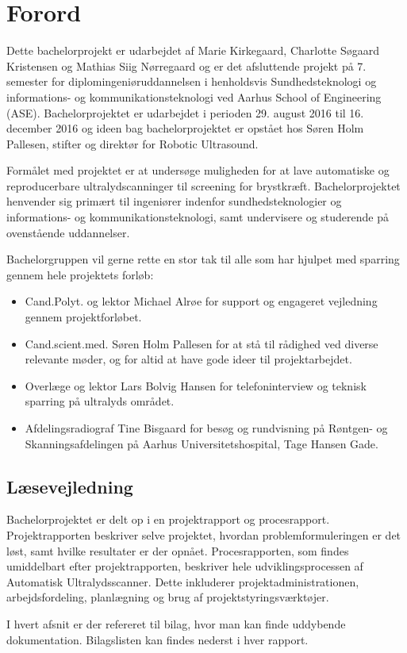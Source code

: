 \chapter{Forord}
Dette bachelorprojekt er udarbejdet af Marie Kirkegaard, Charlotte Søgaard Kristensen og Mathias Siig Nørregaard og er det afsluttende projekt på 7. semester for diplomingeniøruddannelsen i henholdsvis Sundhedsteknologi og informations- og kommunikationsteknologi ved Aarhus School of Engineering (ASE). Bachelorprojektet er udarbejdet i perioden 29. august 2016 til 16. december 2016 og ideen bag bachelorprojektet er opstået hos Søren Holm Pallesen, stifter og direktør for Robotic Ultrasound. 

Formålet med projektet er at undersøge muligheden for at lave automatiske og reproducerbare ultralydscanninger til screening for brystkræft. Bachelorprojektet henvender sig primært til ingeniører indenfor sundhedsteknologier og informations- og  kommunikationsteknologi, samt undervisere og studerende på ovenstående uddannelser. 

Bachelorgruppen vil gerne rette en stor tak til alle som har hjulpet med sparring gennem hele projektets forløb:

\begin{itemize}
\item Cand.Polyt. og lektor Michael Alrøe for support og engageret vejledning gennem projektforløbet.

\item Cand.scient.med. Søren Holm Pallesen for at stå til rådighed ved diverse relevante
møder, og for altid at have gode ideer til projektarbejdet.

\item Overlæge og lektor Lars Bolvig Hansen for telefoninterview og teknisk sparring på ultralyds området.

\item Afdelingsradiograf Tine Bisgaard for besøg og rundvisning på Røntgen- og Skanningsafdelingen på Aarhus Universitetshospital, Tage Hansen Gade. 
\end{itemize}

\section{Læsevejledning} 
Bachelorprojektet er delt op i en projektrapport og procesrapport. Projektrapporten beskriver selve projektet, hvordan problemformuleringen er det løst, samt hvilke resultater er der opnået. Procesrapporten, som findes umiddelbart efter projektrapporten, beskriver hele udviklingsprocessen af Automatisk Ultralydsscanner. Dette inkluderer projektadministrationen, arbejdsfordeling, planlægning og brug af projektstyringsværktøjer. 

I hvert afsnit er der refereret til bilag, hvor man kan finde uddybende dokumentation. Bilagslisten kan findes nederst i hver rapport.   
